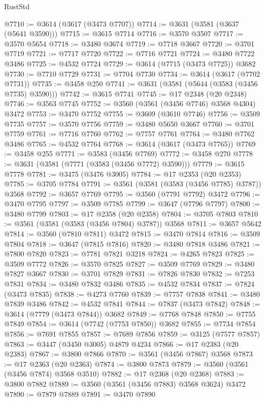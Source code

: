 \begin{lexlean}{RustStd}
\begin{coremodule}
{\begin{coremodule}
{{{{{{{{{{{{{{{{{{{{{{{{{{{{{{{{{{{{{{{{{{{{{@7710 := @3614 (@3617 (@3473 @7707))
@7714 := @3631 (@3581 (@3637 (@5641 @3590)))
@7715 := @3615 @7714
@7716 := @3570 @3507
@7717 := @3570 @5654
@7718 := @3480 @3674
@7719 := @7718 @3667
@7720 := @3701 @7719
@7721 := @7717 @7720
@7722 := @7716 @7721
@7724 := @3480 @7722 @3486
@7725 := @4532 @7724
@7729 := @3614 (@7715 (@3473 @7725)) @3682
@7730 := @7710 @7729
@7731 := @7704 @7730
@7734 := @3614 (@3617 (@7702 @7731))
@7735 := @3458 @250
@7741 := @3631 (@3581 (@5644 (@3583 (@3456 @7735) @3590)))
@7742 := @3615 @7741
@7745 := @17 @2348 (@20 @2348)
@7746 := @3563 @7745
@7752 := @3560 (@3561 (@3456 @7746) @3568 @4304) @3472
@7753 := @3470 @7752
@7755 := @3609 (@3610 @7746)
@7756 := @3509 @7735
@7757 := @3570 @7756
@7759 := @3480 @5650 @3667
@7760 := @3701 @7759
@7761 := @7716 @7760
@7762 := @7757 @7761
@7764 := @3480 @7762 @3486
@7765 := @4532 @7764
@7768 := @3614 (@3617 (@3473 @7765))
@7769 := @3458 @255
@7771 := @3583 (@3456 @7769)
@7772 := @3458 @270
@7778 := @3631 (@3581 (@7771 (@3583 (@3456 @7772) @3590)))
@7779 := @3615 @7778
@7781 := @3475 (@3476 @3005)
@7784 := @17 @2353 (@20 @2353)
@7785 := @3705 @7784
@7791 := @3561 (@3581 (@3583 (@3456 @7785) @3787)) @3568
@7792 := @3657 @7769
@7795 := @3560 (@7791 @7792) @3472
@7796 := @3470 @7795
@7797 := @3509 @7785
@7799 := @3647 (@7796 @7797)
@7800 := @3480 @7799
@7803 := @17 @2358 (@20 @2358)
@7804 := @3705 @7803
@7810 := @3561 (@3581 (@3583 (@3456 @7804) @3787)) @3568
@7811 := @3657 @5642
@7814 := @3560 (@7810 @7811) @3472
@7815 := @3470 @7814
@7816 := @3509 @7804
@7818 := @3647 (@7815 @7816)
@7820 := @3480 @7818 @3486
@7821 := @7800 @7820
@7823 := @7781 @7821 @3218
@7824 := @4265 @7823
@7825 := @3509 @7772
@7826 := @3570 @7825
@7827 := @3509 @7769
@7829 := @3480 @7827 @3667
@7830 := @3701 @7829
@7831 := @7826 @7830
@7832 := @7253 @7831
@7834 := @3480 @7832 @3486
@7835 := @4532 @7834
@7837 := @7824 (@3473 @7835)
@7838 := @4273 @7760
@7839 := @7757 @7838
@7841 := @3480 @7839 @3486
@7842 := @4532 @7841
@7844 := @7837 (@3473 @7842)
@7848 := @3614 (@7779 (@3473 @7844)) @3682
@7849 := @7768 @7848
@7850 := @7755 @7849
@7854 := @3614 (@7742 (@7753 @7850)) @3682
@7855 := @7734 @7854
@7856 := @7691 @7855
@7857 := @7689 @7856
@7859 := @3125 (@7577 @7857)
@7863 := @3447 (@3450 @3005) @4879 @4234
@7866 := @17 @2383 (@20 @2383)
@7867 := @3800 @7866
@7870 := @3561 (@3456 @7867) @3568
@7873 := @17 @2363 (@20 @2363)
@7874 := @3800 @7873
@7879 := @3560 (@3561 (@3456 @7874) @3568 @3510)
@7882 := @17 @2368 (@20 @2368)
@7883 := @3800 @7882
@7889 := @3560 (@3561 (@3456 @7883) @3568 @3624) @3472
@7890 := @7879 @7889
@7891 := @3470 @7890
}}}}}}}}}}}}}}}}}}}}}}}}}}}}}}}}}}}}}}}}}}}}}
\end{coremodule}}
\end{coremodule}
\end{lexlean}
